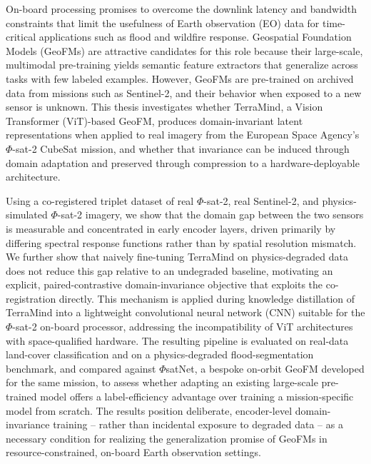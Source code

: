 
On-board processing promises to overcome the downlink latency and bandwidth constraints that limit the usefulness of Earth observation (EO) data for time-critical applications such as flood and wildfire response.
Geospatial Foundation Models (GeoFMs) are attractive candidates for this role because their large-scale, multimodal pre-training yields semantic feature extractors that generalize across tasks with few labeled examples.
However, GeoFMs are pre-trained on archived data from missions such as Sentinel-2, and their behavior when exposed to a new sensor is unknown.
This thesis investigates whether TerraMind, a Vision Transformer (ViT)-based GeoFM, produces domain-invariant latent representations when applied to real imagery from the European Space Agency's $\Phi$-sat-2 CubeSat mission, and whether that invariance can be induced through domain adaptation and preserved through compression to a hardware-deployable architecture.

Using a co-registered triplet dataset of real $\Phi$-sat-2, real Sentinel-2, and physics-simulated $\Phi$-sat-2 imagery, we show that the domain gap between the two sensors is measurable and concentrated in early encoder layers, driven primarily by differing spectral response functions rather than by spatial resolution mismatch.
We further show that naively fine-tuning TerraMind on physics-degraded data does not reduce this gap relative to an undegraded baseline, motivating an explicit, paired-contrastive domain-invariance objective that exploits the co-registration directly.
This mechanism is applied during knowledge distillation of TerraMind into a lightweight convolutional neural network (CNN) suitable for the $\Phi$-sat-2 on-board processor, addressing the incompatibility of ViT architectures with space-qualified hardware.
The resulting pipeline is evaluated on real-data land-cover classification and on a physics-degraded flood-segmentation benchmark, and compared against $\Phi$satNet, a bespoke on-orbit GeoFM developed for the same mission, to assess whether adapting an existing large-scale pre-trained model offers a label-efficiency advantage over training a mission-specific model from scratch.
The results position deliberate, encoder-level domain-invariance training -- rather than incidental exposure to degraded data -- as a necessary condition for realizing the generalization promise of GeoFMs in resource-constrained, on-board Earth observation settings.
